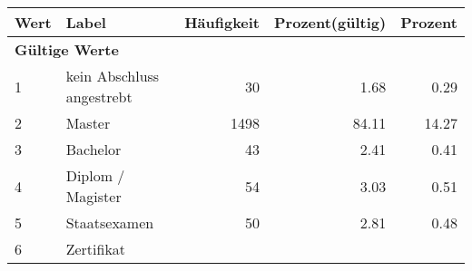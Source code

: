      \begin{longtable}{lXrrr}
     \toprule
     \textbf{Wert} & \textbf{Label} & \textbf{Häufigkeit} & \textbf{Prozent(gültig)} & \textbf{Prozent} \\
     \endhead
     \midrule
     \multicolumn{5}{l}{\textbf{Gültige Werte}}\\

     1 &
     \multicolumn{1}{X}{ kein Abschluss angestrebt   } &


       \num{30} &
       \num[round-mode=places,round-precision=2]{1,68} &
         \num[round-mode=places,round-precision=2]{0,29} \\

     2 &
     \multicolumn{1}{X}{ Master   } &


       \num{1498} &
       \num[round-mode=places,round-precision=2]{84,11} &
         \num[round-mode=places,round-precision=2]{14,27} \\

     3 &
     \multicolumn{1}{X}{ Bachelor   } &


       \num{43} &
       \num[round-mode=places,round-precision=2]{2,41} &
         \num[round-mode=places,round-precision=2]{0,41} \\

     4 &
     \multicolumn{1}{X}{ Diplom / Magister   } &


       \num{54} &
       \num[round-mode=places,round-precision=2]{3,03} &
         \num[round-mode=places,round-precision=2]{0,51} \\

     5 &
     \multicolumn{1}{X}{ Staatsexamen   } &


       \num{50} &
       \num[round-mode=places,round-precision=2]{2,81} &
         \num[round-mode=places,round-precision=2]{0,48} \\

     6 &
     \multicolumn{1}{X}{ Zertifikat   } &



\end{longtable}
